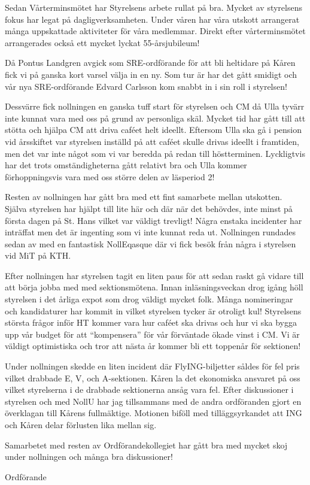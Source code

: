 \documentclass[../_main/handlingar.tex]{subfiles}
\begin{document}

Sedan Vårterminsmötet har Styrelsens arbete rullat på bra. Mycket av styrelsens fokus har legat på dagligverksamheten. Under våren har våra utskott arrangerat många uppskattade aktiviteter för våra medlemmar. Direkt efter vårterminsmötet arrangerades också ett mycket lyckat 55-årsjubileum!

Då Pontus Landgren avgick som SRE-ordförande för att bli heltidare på Kåren fick vi på ganska kort varsel välja in en ny. Som tur är har det gått smidigt och vår nya SRE-ordförande Edvard Carlsson kom snabbt in i sin roll i styrelsen!

Dessvärre fick nollningen en ganska tuff start för styrelsen och CM då Ulla tyvärr inte kunnat vara med oss på grund av personliga skäl. Mycket tid har gått till att stötta och hjälpa CM att driva caféet helt ideellt. Eftersom Ulla ska gå i pension vid årsskiftet var styrelsen inställd på att caféet skulle drivas ideellt i framtiden, men det var inte något som vi var beredda på redan till höstterminen. Lyckligtvis har det trots omständigheterna gått relativt bra och Ulla kommer förhoppningsvis vara med oss större delen av läsperiod 2!

Resten av nollningen har gått bra med ett fint samarbete mellan utskotten. Själva styrelsen har hjälpt till lite här och där när det behövdes, inte minst på första dagen på St. Hans vilket var väldigt trevligt! Några enstaka incidenter har inträffat men det är ingenting som vi inte kunnat reda ut. Nollningen rundades sedan av med en fantastisk NollEqasque där vi fick besök från några i styrelsen vid MiT på KTH.

Efter nollningen har styrelsen tagit en liten paus för att sedan raskt gå vidare till att börja jobba med med sektionsmötena. Innan inläsningsveckan drog igång höll styrelsen i det årliga expot som drog väldigt mycket folk. Många nomineringar och kandidaturer har kommit in vilket styrelsen tycker är otroligt kul! Styrelsens största frågor inför HT kommer vara hur caféet ska drivas och hur vi ska bygga upp vår budget för att ``kompensera'' för vår förväntade ökade vinst i CM. Vi är väldigt optimistiska och tror att nästa år kommer bli ett toppenår för sektionen!

Under nollningen skedde en liten incident där FlyING-biljetter såldes för fel pris vilket drabbade E, V, och A-sektionen. Kåren la det ekonomiska ansvaret på oss vilket styrelserna i de drabbade sektionerna ansåg vara fel. Efter diskussioner i styrelsen och med NollU har jag tillsammans med de andra ordföranden gjort en överklagan till Kårens fullmäktige. Motionen biföll med tilläggsyrkandet att ING och Kåren delar förlusten lika mellan sig.

Samarbetet med resten av Ordförandekollegiet har gått bra med mycket skoj under nollningen och många bra diskussioner!

\begin{signatures}{1}
    \mvh
    \signature{\ordf}{Ordförande}
\end{signatures}
\end{document}
